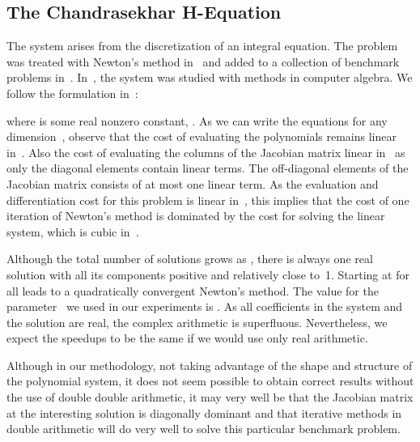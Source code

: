 \documentclass{article}
\begin{document}
\subsection{The Chandrasekhar H-Equation}

The system arises from the discretization of an integral equation.
The problem was treated with Newton's method in~\cite{Kel80}
and added to a collection of benchmark problems in~\cite{Mor90}.
In~\cite{Gon95}, the system was studied with methods in computer algebra.
We follow the formulation in~\cite{Gon95}:

where  is some real nonzero constant, .
As we can write the equations for any dimension~,
observe that the cost of evaluating the polynomials remains
linear in~.  Also the cost of evaluating the columns of 
the Jacobian matrix linear in~ as only the diagonal elements
contain  linear terms.  The off-diagonal elements of the
Jacobian matrix consists of at most one linear term.
As the evaluation and differentiation cost for this problem
is linear in~, this implies that the cost of one iteration
of Newton's method is dominated by the cost for solving the
linear system, which is cubic in~.

Although the total number of solutions grows as ,
there is always one real solution with all its components positive
and relatively close to~1.  Starting at  for all 
leads to a quadratically convergent Newton's method.
The value for the parameter~ we used in our experiments is .
As all coefficients in the system and the solution are real,
the complex arithmetic is superfluous.  Nevertheless, we expect
the speedups to be the same if we would use only real arithmetic.

Although in our methodology, not taking advantage of
the shape and structure of the polynomial system,
it does not seem possible to obtain correct results without
the use of double double arithmetic, it may very well be
that the Jacobian matrix at the interesting solution is
diagonally dominant and that iterative methods in double arithmetic
will do very well to solve this particular benchmark problem.
\end{document}

